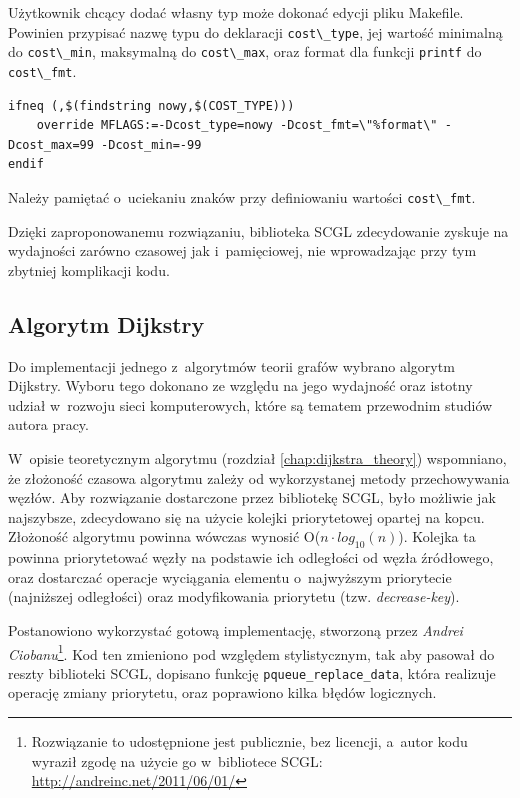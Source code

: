 \documentclass[a4paper,12pt,polish,twoside,openright]{thesis}
\newcommand\code[1]{\lstinline[style=line]{#1}}
\begin{document}
Użytkownik chcący dodać własny typ może dokonać edycji pliku Makefile.
Powinien przypisać nazwę typu do deklaracji \code{cost\_type}, jej wartość minimalną do \code{cost\_min}, maksymalną do \code{cost\_max}, oraz format dla funkcji \code{printf} do \code{cost\_fmt}.
\begin{lstlisting}[style=coden,caption=Przykład nowego typu kosztu krawędzi]
ifneq (,$(findstring nowy,$(COST_TYPE)))
	override MFLAGS:=-Dcost_type=nowy -Dcost_fmt=\"%format\" -Dcost_max=99 -Dcost_min=-99
endif
\end{lstlisting}
Należy pamiętać o~uciekaniu znaków przy definiowaniu wartości \code{cost\_fmt}.

Dzięki zaproponowanemu rozwiązaniu, biblioteka SCGL zdecydowanie zyskuje na wydajności zarówno czasowej jak i~pamięciowej, nie wprowadzając przy tym zbytniej komplikacji kodu.

\subsection{Algorytm Dijkstry}
\label{chap:dijkstra}
Do implementacji jednego z~algorytmów teorii grafów wybrano algorytm Dijkstry.
Wyboru tego dokonano ze względu na jego wydajność oraz istotny udział w~rozwoju sieci komputerowych, które są tematem przewodnim studiów autora pracy.

W~opisie teoretycznym algorytmu (rozdział \ref{chap:dijkstra_theory}) wspomniano, że złożoność czasowa algorytmu zależy od wykorzystanej metody przechowywania węzłów.
Aby rozwiązanie dostarczone przez bibliotekę SCGL, było możliwie jak najszybsze, zdecydowano się na użycie kolejki priorytetowej opartej na kopcu.
Złożoność algorytmu powinna wówczas wynosić O($n \cdot log_{10}{(n)}$)\cite{art1}.
Kolejka ta powinna priorytetować węzły na podstawie ich odległości od węzła źródłowego, oraz dostarczać operacje wyciągania elementu o~najwyższym priorytecie (najniższej odległości) oraz modyfikowania priorytetu (tzw. \emph{decrease-key}).

Postanowiono wykorzystać gotową implementację, stworzoną przez \emph{Andrei Ciobanu}\footnote{Rozwiązanie to udostępnione jest publicznie, bez licencji, a~autor kodu wyraził zgodę na użycie go w~bibliotece SCGL: \url{http://andreinc.net/2011/06/01/}}.
Kod ten zmieniono pod względem stylistycznym, tak aby pasował do reszty biblioteki SCGL, dopisano funkcję \code{pqueue_replace_data}, która realizuje operację zmiany priorytetu, oraz poprawiono kilka błędów logicznych.
\end{document}
